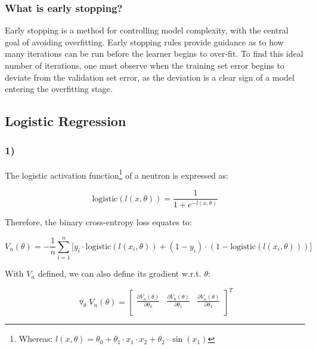 \documentclass[12pt,a4paper]{article}
\begin{document}
\subsubsection*{What is early stopping?}

Early stopping is a method for controlling model complexity, with the central goal of avoiding overfitting. Early stopping rules provide guidance as to how many iterations can be run before the learner begins to over-fit. To find this ideal number of iterations, one must observe when the training set error begins to deviate from the validation set error, as the deviation is a clear sign of a model entering the overfitting stage.

\newpage
\subsection*{Logistic Regression}

\subsubsection*{1)}

The logistic activation function\footnote{Whereas: $l(x,\theta) = \theta_0 + \theta_1 \cdot x_1 \cdot x_2 + \theta_2 \cdot \sin(x_1)$} of a neutron is expressed as:

\begin{equation*}
	\text{logistic}(l(x,\theta)) = \frac{1}{1+e^{-l(x,\theta)}}
\end{equation*}

Therefore, the binary cross-entropy loss equates to:

\begin{equation*}
	V_n(\theta) = - \frac{1}{n} \displaystyle \sum_{i=1}^n \lbrack y_i \cdot \text{logistic}(l(x_i,\theta)) + (1 - y_i) \cdot (1 - \text{logistic}(l(x_i,\theta))) \rbrack
\end{equation*}

With $V_n$ defined, we can also define its gradient w.r.t. $\theta$:

\begin{equation*}
	\triangledown_\theta V_n(\theta) = 
	\begin{bmatrix}
		\frac{\partial V_n (\theta)}{\partial \theta_0} & \frac{\partial V_n (\theta)}{\partial \theta_1} & \frac{\partial V_n (\theta)}{\partial \theta_2} \\
	\end{bmatrix}^{T}
\end{equation*}
\end{document}
